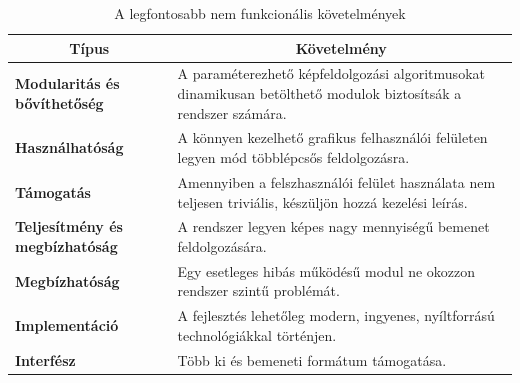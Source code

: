 \documentclass[a4paper,12pt,oneside]{report}
\begin{document}
\begin{table}[h]
\begin{tabular}{p{3cm}|p{10cm}}

\toprule
\multicolumn{1}{c}{\textbf{Típus}} & \multicolumn{1}{c}{\textbf{Követelmény}} \\ \midrule
\textbf{Modularitás és bővíthetőség} & A paraméterezhető képfeldolgozási algoritmusokat dinamikusan betölthető modulok biztosítsák a rendszer számára.\\
\hline
\textbf{Használhatóság} & A könnyen kezelhető grafikus felhasználói felületen legyen mód többlépcsős feldolgozásra. \\
\hline
\textbf{Támogatás} & Amennyiben a felszhasználói felület használata nem teljesen triviális, készüljön hozzá kezelési leírás. \\
\hline
\textbf{Teljesítmény és megbízhatóság} & A rendszer legyen képes nagy mennyiségű bemenet feldolgozására. \\
\hline
\textbf{Megbízhatóság} & Egy esetleges hibás működésű modul ne okozzon rendszer szintű problémát. \\
\hline
\textbf{Implementáció} & A fejlesztés lehetőleg modern, ingyenes, nyíltforrású technológiákkal történjen. \\ 
\hline
\textbf{Interfész} & Több ki és bemeneti formátum támogatása. \\
\hline
\end{tabular}
\caption{A legfontosabb nem funkcionális követelmények}
\label{table:nonfunct_req_table}
\end{table}
\end{document}
